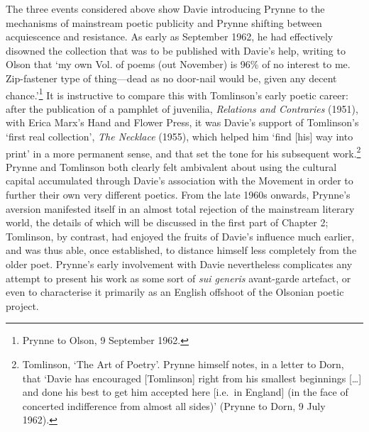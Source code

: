 \documentclass[]{article}
\begin{document}
The three events considered above show Davie introducing Prynne to the
mechanisms of mainstream poetic publicity and Prynne shifting between
acquiescence and resistance. As early as September 1962, he had
effectively disowned the collection that was to be published with
Davie’s help, writing to Olson that ‘my own Vol. of poems (out November)
is 96\% of no interest to me. Zip-fastener type of thing—dead as no
door-nail would be, given any decent chance.’\footnote{Prynne to Olson,
  9 September 1962.} It is instructive to compare this with Tomlinson’s
early poetic career: after the publication of a pamphlet of juvenilia,
\emph{Relations and Contraries} (1951), with Erica Marx’s Hand and
Flower Press, it was Davie’s support of Tomlinson’s ‘first real
collection’, \emph{The Necklace} (1955), which helped him ‘find
{[}his{]} way into print’ in a more permanent sense, and that set the
tone for his subsequent work.\footnote{Tomlinson, ‘The Art of Poetry’.
  Prynne himself notes, in a letter to Dorn, that ‘Davie has encouraged
  {[}Tomlinson{]} right from his smallest beginnings {[}\ldots{}{]} and
  done his best to get him accepted here {[}i.e.~in England{]} (in the
  face of concerted indifference from almost all sides)’ (Prynne to
  Dorn, 9 July 1962).} Prynne and Tomlinson both clearly felt ambivalent
about using the cultural capital accumulated through Davie’s association
with the Movement in order to further their own very different poetics.
From the late 1960s onwards, Prynne’s aversion manifested itself in an
almost total rejection of the mainstream literary world, the details of
which will be discussed in the first part of Chapter 2; Tomlinson, by
contrast, had enjoyed the fruits of Davie’s influence much earlier, and
was thus able, once established, to distance himself less completely
from the older poet. Prynne’s early involvement with Davie nevertheless
complicates any attempt to present his work as some sort of \emph{sui
generis} avant-garde artefact, or even to characterise it primarily as
an English offshoot of the Olsonian poetic project.
\end{document}
